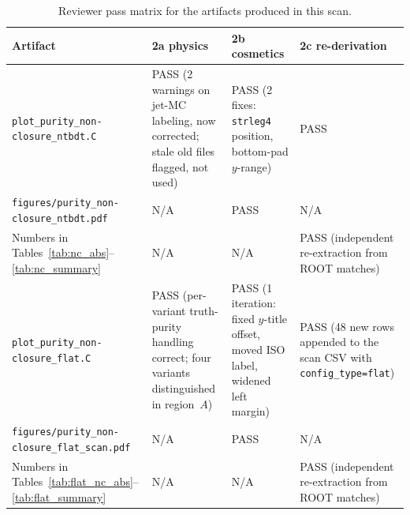 \documentclass[11pt]{article}
\begin{document}
\begin{table}[ht]
  \centering
  \small
  \caption{Reviewer pass matrix for the artifacts produced in this scan.}
  \label{tab:reviewer}
  \renewcommand{\arraystretch}{1.15}
  \begin{tabular}{@{}p{} p{} p{} p{}@{}}
    \toprule
    Artifact & 2a physics & 2b cosmetics & 2c re-derivation \\
    \midrule
    \texttt{plot\_purity\_non-} \texttt{closure\_ntbdt.C}
      & PASS (2 warnings on jet-MC labeling, now corrected; stale old files flagged, not used)
      & PASS (2 fixes: \texttt{strleg4} position, bottom-pad $y$-range)
      & PASS \\[2pt]
    \texttt{figures/purity\_non-} \texttt{closure\_ntbdt.pdf}
      & N/A
      & PASS
      & N/A \\[2pt]
    Numbers in Tables~\ref{tab:nc_abs}--\ref{tab:nc_summary}
      & N/A
      & N/A
      & PASS (independent re-extraction from ROOT matches) \\[2pt]
    \texttt{plot\_purity\_non-} \texttt{closure\_flat.C}
      & PASS (per-variant truth-purity handling correct; four variants distinguished in region~$A$)
      & PASS (1 iteration: fixed $y$-title offset, moved ISO label, widened left margin)
      & PASS (48 new rows appended to the scan CSV with \texttt{config\_type=flat}) \\[2pt]
    \texttt{figures/purity\_non-} \texttt{closure\_flat\_scan.pdf}
      & N/A
      & PASS
      & N/A \\[2pt]
    Numbers in Tables~\ref{tab:flat_nc_abs}--\ref{tab:flat_summary}
      & N/A
      & N/A
      & PASS (independent re-extraction from ROOT matches) \\
    \bottomrule
  \end{tabular}
\end{table}
\end{document}
